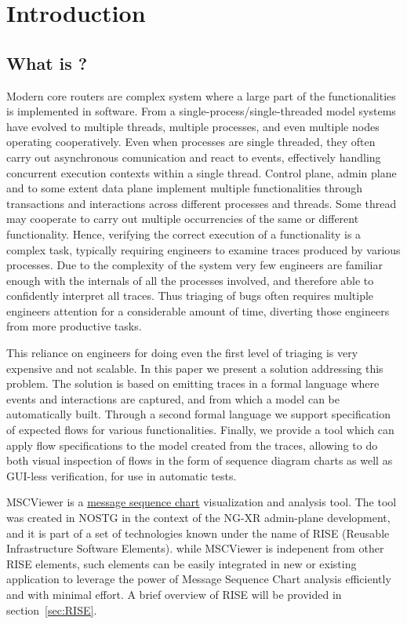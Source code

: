 \chapter{Introduction}


\section{What is \prog?}
Modern core routers are complex system where a large part of the functionalities
is implemented in software. From a single-process/single-threaded model
systems have evolved to multiple threads, multiple processes, and even multiple 
nodes operating cooperatively. Even when processes are single threaded, they 
often carry out asynchronous comunication and react to events, effectively
handling concurrent execution contexts within a single thread. Control plane,
admin plane and to some extent data plane implement multiple functionalities
through transactions and interactions across different processes and threads.
Some thread may cooperate to carry out multiple occurrencies of the same or
different functionality. Hence, verifying the correct execution of a
functionality is a complex task, typically requiring engineers to examine traces
produced by various processes. Due to the complexity of the system
very few engineers are familiar enough with the internals of all the
processes involved, and therefore able to confidently interpret all traces. Thus
triaging of bugs often requires multiple engineers attention for a considerable
amount of time, diverting those engineers from more productive tasks.
 
This reliance on engineers for doing even the first level of triaging is very
expensive and not scalable. In this paper we present a solution addressing this  
problem. The solution is based on emitting traces in a formal language where 
events and interactions are captured, and from which a model can be
automatically built. Through a second formal language we support specification
of expected flows for various functionalities. Finally, we provide a tool which
can  apply flow specifications to the model created from the traces, allowing
to do both visual inspection of flows in the form of sequence diagram charts as
well as GUI-less verification, for use in automatic tests. 
  

MSCViewer is a
\href{http://en.wikipedia.org/wiki/Message_Sequence_Chart#Live_Sequence_Charts}{message sequence chart}
visualization and analysis tool. The tool was created in NOSTG in the context of
the NG-XR admin-plane development, and it is part of a set of technologies known
under the name of RISE (Reusable Infrastructure Software Elements).
while MSCViewer is indepenent from other RISE elements, such elements can
be easily integrated in new or existing application to 
leverage the power of Message Sequence Chart analysis efficiently and with
minimal effort.
A brief overview of RISE will be provided in section~\ref{sec:RISE}. 
